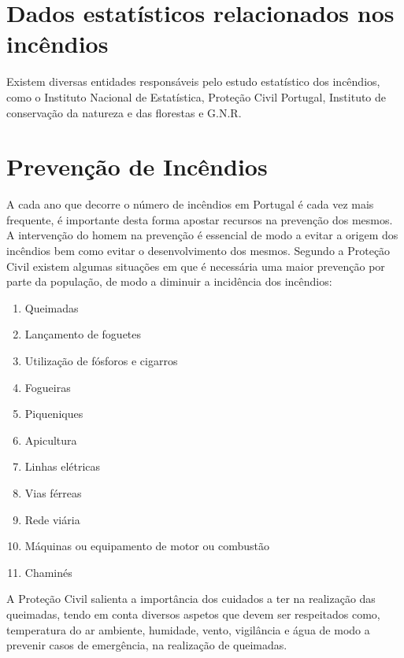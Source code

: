 \documentclass{report}
\begin{document}

\chapter{Dados estatísticos relacionados nos incêndios}

Existem diversas entidades responsáveis pelo estudo estatístico dos incêndios, como o Instituto Nacional de Estatística, Proteção Civil Portugal, Instituto de conservação da natureza e das florestas e G.N.R.


\chapter{Prevenção de Incêndios}
\cite{dgsefeitos-fumo}

A cada ano que decorre o número de incêndios em Portugal é cada vez mais frequente, é importante desta forma apostar recursos na prevenção dos mesmos. A intervenção do homem na prevenção é essencial de modo a evitar a origem dos incêndios bem como evitar o desenvolvimento dos mesmos. Segundo a Proteção Civil existem algumas situações em que é necessária uma maior prevenção por parte da população, de modo a diminuir a incidência dos incêndios:
\begin{enumerate}
 \item Queimadas
 \item Lançamento de foguetes
 \item Utilização de fósforos e cigarros
 \item Fogueiras
 \item Piqueniques
 \item Apicultura
 \item Linhas elétricas
 \item Vias férreas
 \item Rede viária
 \item Máquinas ou equipamento de motor ou combustão
 \item Chaminés
\end{enumerate}

A Proteção Civil salienta a importância dos cuidados a ter na realização das queimadas, tendo em conta diversos aspetos que devem ser respeitados como, temperatura do ar ambiente, humidade, vento, vigilância e água de modo a prevenir casos de emergência, na realização de queimadas.
\end{document}

